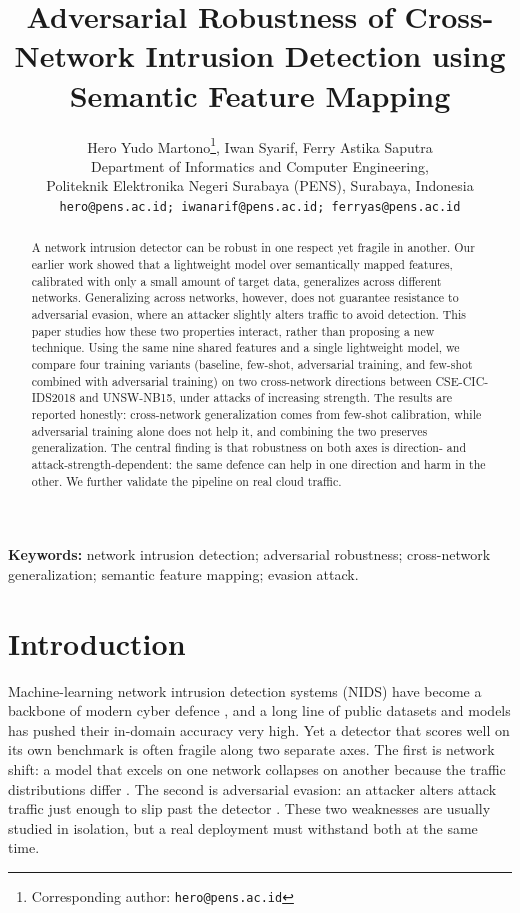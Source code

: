 \documentclass[11pt,a4paper]{article}
\title{\textbf{Adversarial Robustness of Cross-Network Intrusion Detection
using Semantic Feature Mapping}}
\author{Hero Yudo Martono\thanks{Corresponding author: \texttt{hero@pens.ac.id}},
\quad Iwan Syarif, \quad Ferry Astika Saputra \\[0.3em]
\normalsize Department of Informatics and Computer Engineering, \\
\normalsize Politeknik Elektronika Negeri Surabaya (PENS), Surabaya, Indonesia \\
\normalsize \texttt{hero@pens.ac.id; iwanarif@pens.ac.id; ferryas@pens.ac.id}}
\date{}
\begin{document}
\maketitle

\begin{abstract}
\noindent A network intrusion detector can be robust in one respect yet fragile in
another. Our earlier work showed that a lightweight model over semantically mapped
features, calibrated with only a small amount of target data, generalizes across
different networks. Generalizing across networks, however, does not guarantee
resistance to adversarial evasion, where an attacker slightly alters traffic to avoid
detection. This paper studies how these two properties interact, rather than proposing
a new technique. Using the same nine shared features and a single lightweight model, we
compare four training variants (baseline, few-shot, adversarial training, and
few-shot combined with adversarial training) on two cross-network directions between
CSE-CIC-IDS2018 and UNSW-NB15, under attacks of increasing strength. The results are
reported honestly: cross-network generalization comes from few-shot calibration, while
adversarial training alone does not help it, and combining the two preserves
generalization. The central finding is that robustness on both axes is
direction- and attack-strength-dependent: the same defence can help in one direction
and harm in the other. We further validate the pipeline on real cloud traffic.
\end{abstract}

\medskip
\noindent\textbf{Keywords:} network intrusion detection; adversarial robustness;
cross-network generalization; semantic feature mapping; evasion attack.

\section{Introduction}
Machine-learning network intrusion detection systems (NIDS) have become a backbone of
modern cyber defence \cite{cremer,khraisat}, and a long line of public datasets and
models has pushed their in-domain accuracy very high. Yet a detector that scores well on
its own benchmark is often fragile along two separate axes. The first is network shift: a
model that excels on one network collapses on another because the traffic distributions
differ \cite{dhooge,cantone}. The second is adversarial evasion: an attacker alters
attack traffic just enough to slip past the detector \cite{biggio2013,goodfellow2015}.
These two weaknesses are usually studied in isolation, but a real deployment must
withstand both at the same time.
\end{document}
